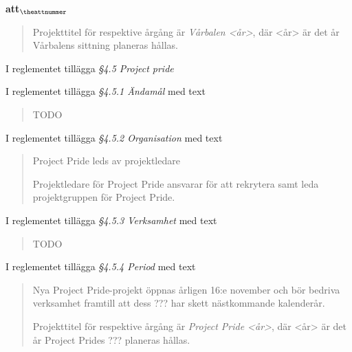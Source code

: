 \documentclass[a4paper]{article}
\begin{document}
\begin{list}{\bf att$_{\theattnummer}$}{}
\begin{quote}
        Projekttitel för respektive årgång är \textit{Vårbalen <år>}, där <år> är det år Vårbalens sittning planeras hållas.
    \end{quote}


\item I reglementet tillägga \textit{\S4.5 Project pride}
\item I reglementet tillägga \textit{\S4.5.1 Ändamål} med text
    \begin{quote}
        TODO
    \end{quote}
\item I reglementet tillägga \textit{\S4.5.2 Organisation} med text
    \begin{quote}
        Project Pride leds av projektledare

        Projektledare för Project Pride ansvarar för att rekrytera samt leda projektgruppen för Project Pride.
    \end{quote}
\item I reglementet tillägga \textit{\S4.5.3 Verksamhet} med text
    \begin{quote}
        TODO
    \end{quote}
\item I reglementet tillägga \textit{\S4.5.4 Period} med text
    \begin{quote}
        Nya Project Pride-projekt öppnas årligen 16:e november och bör bedriva verksamhet framtill att dess ??? har skett nästkommande kalenderår.

        Projekttitel för respektive årgång är \textit{Project Pride <år>}, där <år> är det år Project Prides ??? planeras hållas.
    \end{quote}


\end{list}
\end{document}
